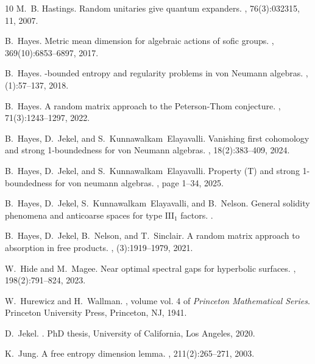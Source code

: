 \documentclass[10pt]{amsart}
\theoremstyle{definition}
\numberwithin{equation}{section}
\begin{document}
\begin{thebibliography}{10}
M.~B. Hastings.
\newblock Random unitaries give quantum expanders.
, 76(3):032315, 11, 2007.

B.~Hayes.
\newblock Metric mean dimension for algebraic actions of sofic groups.
, 369(10):6853--6897, 2017.

B.~Hayes.
-bounded entropy and regularity problems in von {N}eumann algebras.
, (1):57--137, 2018.

B.~Hayes.
\newblock A random matrix approach to the {P}eterson-{T}hom conjecture.
, 71(3):1243--1297, 2022.

B.~Hayes, D.~Jekel, and S.~Kunnawalkam~Elayavalli.
\newblock Vanishing first cohomology and strong 1-boundedness for von {N}eumann algebras.
, 18(2):383--409, 2024.

B.~Hayes, D.~Jekel, and S.~Kunnawalkam~Elayavalli.
\newblock Property ({T}) and strong 1-boundedness for von neumann algebras.
, page 1–34, 2025.

B.~Hayes, D.~Jekel, S.~Kunnawalkam~Elayavalli, and B.~Nelson.
\newblock General solidity phenomena and anticoarse spaces for type $\mathrm{III}_1$ factors.
.

B.~Hayes, D.~Jekel, B.~Nelson, and T.~Sinclair.
\newblock A random matrix approach to absorption in free products.
, (3):1919--1979, 2021.

W.~Hide and M.~Magee.
\newblock Near optimal spectral gaps for hyperbolic surfaces.
, 198(2):791--824, 2023.

W.~Hurewicz and H.~Wallman.
, volume vol. 4 of {\em Princeton Mathematical Series}.
\newblock Princeton University Press, Princeton, NJ, 1941.

D.~Jekel.
.
\newblock PhD thesis, University of California, Los Angeles, 2020.

K.~Jung.
\newblock A free entropy dimension lemma.
, 211(2):265--271, 2003.


\end{thebibliography}
\end{document}
